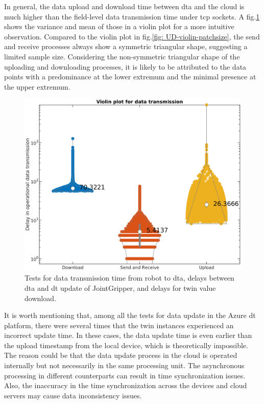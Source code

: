 In general, the data upload and download time between \gls{dta} and the cloud is 
much higher than the field-level data transmission time under \gls{tcp} sockets. 
A fig.\ref{fig: SR-U-D-violin} shows the variance and mean of those in a violin plot 
for a more intuitive observation. 
Compared to the violin plot in fig.\ref{fig: UD-violin-patchsize}, the send and receive 
processes always show a symmetric triangular shape, suggesting a limited sample size. 
Considering the non-symmetric triangular shape of the uploading and downloading processes, 
it is likely to be attributed to the data points with a predominance at the lower extremum 
and the minimal presence at the upper extremum.
\begin{figure}[htb]
    \includegraphics[width=\textwidth]{figures/tests/DT/log_violin_Plot_3cat.png}
    \centering
    \caption{Tests for data transmission time from robot to \gls{dta}, 
    delays between \gls{dta} and \gls{dt} 
    update of JointGripper, and delays for twin value download.\label{fig: SR-U-D-violin}} 
\end{figure}


It is worth mentioning that, among all the tests for data update 
in the Azure \gls{dt} platform, there were several times that the 
twin instances experienced an incorrect update time. In these cases, 
the data update time is even earlier than the upload timestamp from the 
local device, which is theoretically impossible. The reason could be 
that the data update process in the cloud is operated internally but not necessarily in 
the same processing unit. The asynchronous processing in different counterparts 
can result in time synchronization issues. Also, the inaccuracy in the 
time synchronization across the devices and cloud servers may cause data 
inconsistency issues.





